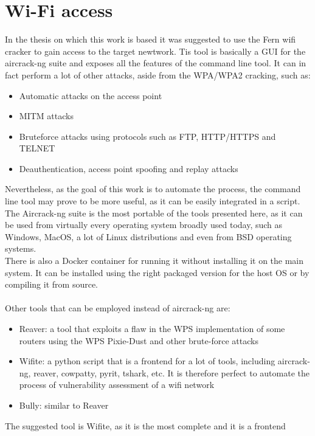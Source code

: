 \chapter{Wi-Fi access}
In the thesis on which\cite{previouswork} this work is based it was suggested
to use the Fern wifi cracker\cite{fern} to gain access to the target newtwork.
Tis tool is basically a GUI for the aircrack-ng suite\cite{aircrack} and
exposes all the features of the command line tool. It can in fact perform
a lot of other attacks, aside from the WPA/WPA2 cracking, such as:
\begin{itemize}
    \item Automatic attacks on the access point
    \item MITM attacks
    \item Bruteforce attacks using protocols such as FTP, HTTP/HTTPS and TELNET
    \item Deauthentication, access point spoofing and replay attacks
\end{itemize}
Nevertheless, as the goal of this work is to automate the process, the command
line tool may prove to be more useful, as it can be easily integrated in a
script.\\
The Aircrack-ng suite is the most portable of the tools presented here, as it
can be used from virtually every operating system broadly used today, such as 
Windows, MacOS, a lot of Linux distributions and even from BSD operating systems.\\
There is also a Docker container for running it without installing it on the
main system. It can be installed using the right packaged version for the host OS
or by compiling it from source\cite{aircrack-git}.\\\\
Other tools that can be employed instead of aircrack-ng are:
\begin{itemize}
    \item Reaver\cite{reaver}: a tool that exploits a flaw in the WPS
        implementation of some routers using the WPS Pixie-Dust and other brute-force attacks
    \item Wifite\cite{wifite}: a python script that is a frontend for a lot of 
        tools, including aircrack-ng, reaver, cowpatty, pyrit, tshark, etc. It
        is therefore perfect to automate the process of vulnerability assessment
        of a wifi network
    \item Bully\cite{bully}: similar to Reaver
\end{itemize}
The suggested tool is Wifite, as it is the most complete and it is a frontend
